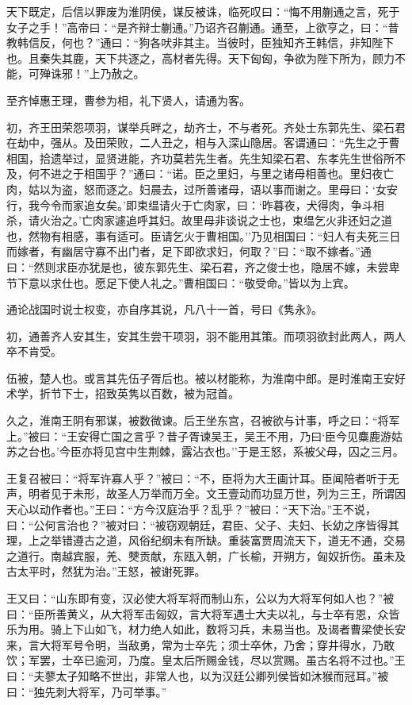 \documentclass[]{article}
\begin{document}
天下既定，后信以罪废为淮阴侯，谋反被诛，临死叹曰：``悔不用蒯通之言，死于女子之手！''高帝曰：``是齐辩士蒯通。''乃诏齐召蒯通。通至，上欲亨之，曰：``昔教韩信反，何也？''通曰：``狗各吠非其主。当彼时，臣独知齐王韩信，非知陛下也。且秦失其鹿，天下共逐之，高材者先得。天下匈匈，争欲为陛下所为，顾力不能，可殚诛邪！''上乃赦之。

至齐悼惠王理，曹参为相，礼下贤人，请通为客。

初，齐王田荣怨项羽，谋举兵畔之，劫齐士，不与者死。齐处士东郭先生、梁石君在劫中，强从。及田荣败，二人丑之，相与入深山隐居。客谓通曰：``先生之于曹相国，拾遗举过，显贤进能，齐功莫若先生者。先生知梁石君、东孝先生世俗所不及，何不进之于相国乎？''通曰：``诺。臣之里妇，与里之诸母相善也。里妇夜亡肉，姑以为盗，怒而逐之。妇晨去，过所善诸母，语以事而谢之。里母曰：`女安行，我今令而家追女矣。'即束缊请火于亡肉家，曰：`昨暮夜，犬得肉，争斗相杀，请火治之。'亡肉家遽追呼其妇。故里母非谈说之士也，束缊乞火非还妇之道也，然物有相感，事有适可。臣请乞火于曹相国。''乃见相国曰：``妇人有夫死三日而嫁者，有幽居守寡不出门者，足下即欲求妇，何取？''曰：``取不嫁者。''通曰：``然则求臣亦犹是也，彼东郭先生、梁石君，齐之俊士也，隐居不嫁，未尝卑节下意以求仕也。愿足下使人礼之。''曹相国曰：``敬受命。''皆以为上宾。

通论战国时说士权变，亦自序其说，凡八十一首，号曰《隽永》。

初，通善齐人安其生，安其生尝干项羽，羽不能用其策。而项羽欲封此两人，两人卒不肯受。

伍被，楚人也。或言其先伍子胥后也。被以材能称，为淮南中郎。是时淮南王安好术学，折节下士，招致英隽以百数，被为冠首。

久之，淮南王阴有邪谋，被数微谏。后王坐东宫，召被欲与计事，呼之曰：``将军上。''被曰：``王安得亡国之言乎？昔子胥谏吴王，吴王不用，乃曰`臣今见麋鹿游姑苏之台也。'今臣亦将见宫中生荆棘，露沾衣也。''于是王怒，系被父母，囚之三月。

王复召被曰：``将军许寡人乎？''被曰：``不，臣将为大王画计耳。臣闻陪者听于无声，明者见于未形，故圣人万举而万全。文王壹动而功显万世，列为三王，所谓因天心以动作者也。''王曰：``方今汉庭治乎？乱乎？''被曰：``天下治。''王不说，曰：``公何言治也？''被对曰：``被窃观朝廷，君臣、父子、夫妇、长幼之序皆得其理，上之举错遵古之道，风俗纪纲未有所缺。重装富贾周流天下，道无不通，交易之道行。南越宾服，羌、僰贡献，东瓯入朝，广长榆，开朔方，匈奴折伤。虽未及古太平时，然犹为治。''王怒，被谢死罪。

王又曰：``山东即有变，汉必使大将军将而制山东，公以为大将军何如人也？''被曰：``臣所善黄义，从大将军击匈奴，言大将军遇士大夫以礼，与士卒有恩，众皆乐为用。骑上下山如飞，材力绝人如此，数将习兵，未易当也。及谒者曹梁使长安来，言大将军号令明，当敌勇，常为士卒先；须士卒休，乃舍；穿井得水，乃敢饮；军罢，士卒已逾河，乃度。皇太后所赐金钱，尽以赏赐。虽古名将不过也。''王曰：``夫蓼太子知略不世出，非常人也，以为汉廷公卿列侯皆如沐猴而冠耳。''被曰：``独先刺大将军，乃可举事。''
\end{document}
